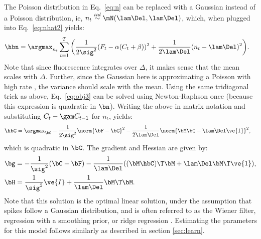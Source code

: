 The Poisson distribution in Eq.~\eqref{eq:n} can be replaced with a Gaussian instead of a Poisson distribution, ie,  $n_t \overset{iid}{\sim} \mN(\lam \Del, \lam \Del)$, which, when plugged into Eq.~\eqref{eq:nhat2} yields:
\begin{align} \label{eq:obj5}
\hbn &= \argmax_{n_t}  \sum_{t=1}^T \bigg( \frac{1}{2 \sig^2}(F_t - \alpha(C_t + \beta))^2  + 
 \frac{1}{2 \lam \Del}(n_t - \lam \Del)^2\bigg).
\end{align}
Note that since fluorescence integrates over $\Delta$, it makes sense that the mean scales with $\Delta$.  Further, since the Gaussian here is approximating a Poisson with high rate \cite{SjulsonMiesenbock07}, the variance should scale with the mean.  Using the same tridiagonal trick as above, Eq.~\eqref{eq:obj3} can be solved using Newton-Raphson once (because this expression is quadratic in $\bn$).  Writing the above in matrix notation and substituting $C_t - \gam C_{t-1}$ for $n_t$, yields:
\begin{align}   \label{eq:w2}
\hbC&= \argmax_{\bC} -\frac{1}{2\sig^2} \norm{\bF - \bC}^2 - \frac{1}{2\lam\Del} \norm{\bM \bC - \lam\Del\ve{1}}^2,
\end{align}
\noindent which is quadratic in $\bC$.  The gradient and Hessian are given by:
\begin{align}
\bg &= -\frac{1}{\sig^2} (\bC - \bF) - \frac{1}{\lam\Del} ( (\bM \hbC)\T \bM + \lam\Del \bM\T \ve{1}), \\
\bH &= \frac{1}{\sig^2} \ve{I} + \frac{1}{\lam\Del} \bM\T \bM.
\end{align}
Note that this solution is the optimal linear solution, under the assumption that spikes follow a Gaussian distribution, and is often referred to as the Wiener filter, regression with a smoothing prior, or ridge regression \cite{CONV04}.  Estimating the parameters for this model follows similarly as described in section \ref{sec:learn}.
